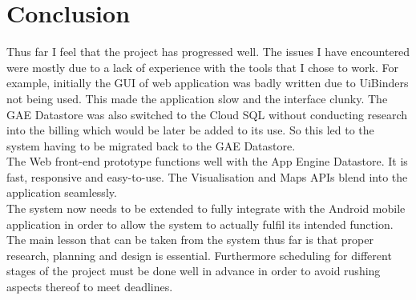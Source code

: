 \section{Conclusion}

Thus far I feel that the project has progressed well. The issues I have encountered were mostly due to a lack of experience with the tools that I chose to work. For example, initially the GUI of web application was badly written due to UiBinders not being used. This made the application slow and the interface clunky. The GAE Datastore was also switched to the Cloud SQL without conducting research into the billing which would be later be added to its use. So this led to the system having to be migrated back to the GAE Datastore.\\
The Web front-end prototype functions well with the App Engine Datastore. It is fast, responsive and easy-to-use. The Visualisation and Maps APIs blend into the application seamlessly. \\
The system now needs to be extended to fully integrate with the Android mobile application in order to allow the system to actually fulfil its intended function. \\
The main lesson that can be taken from the system thus far is that proper research, planning and design is essential. Furthermore scheduling for different stages of the project must be done well in advance in order to avoid rushing aspects thereof to meet deadlines.
